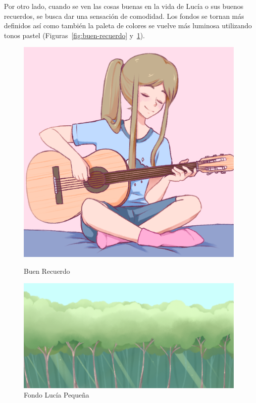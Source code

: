 Por otro lado, cuando se ven las cosas buenas en la vida de Lucía o sus buenos recuerdos, se busca dar una sensación de comodidad. Los fondos se tornan más definidos así como también la paleta de colores se vuelve más luminosa utilizando tonos pastel (Figuras~\ref{fig:buen-recuerdo} y~\ref{fig:fondo-pequeña}).
\begin{figure}[ht]
    \centering
    \begin{minipage}{.34\textwidth}
        \includegraphics[width=.95\textwidth]{imgs/Memory3.png}
        \caption{Buen Recuerdo}
        \label{fig:buen-recuerdo}
    \end{minipage}
    \begin{minipage}{.65\textwidth}
        \includegraphics[width=\textwidth]{imgs/bg.png}
        \caption{Fondo Lucía Pequeña}
        \label{fig:fondo-pequeña}
    \end{minipage}
\end{figure}

